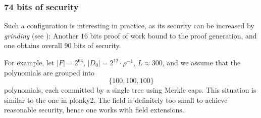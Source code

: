 \documentclass[11pt]{article}
\theoremstyle{definition}
\theoremstyle{remark}
\begin{document}
\subsubsection{74 bits of security}

Such a configuration is interesting in practice, as its security can be increased by \textit{grinding} (see \cite{ethSTARK}): 
Another $16$ bits proof of work bound to the proof generation, and one obtains overall  $90$ bits of security. 

For example, let $|F|=2^{64}$, $|D_0|=2^{12}\cdot\rho^{-1}$, $L\approx 300$, and we assume that the polynomials are grouped into 
\[
\{100,100,100\} 
\]
polynomials, each committed by a single tree using Merkle caps. 
This situation is similar to the one in plonky2. 
The field is definitely too small to achieve reasonable security, hence one works with field extensions. 
\end{document}
